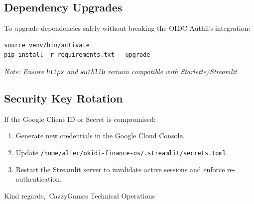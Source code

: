 \documentclass[12pt,a4paper]{article}
\begin{document}
\subsection{Dependency Upgrades}
To upgrade dependencies safely without breaking the OIDC Authlib integration:
\begin{verbatim}
source venv/bin/activate
pip install -r requirements.txt --upgrade
\end{verbatim}
\textit{Note: Ensure \texttt{httpx} and \texttt{authlib} remain compatible with Starlette/Streamlit.}

\subsection{Security Key Rotation}
If the Google Client ID or Secret is compromised:
\begin{enumerate}
    \item Generate new credentials in the Google Cloud Console.
    \item Update \texttt{/home/alier/okidi-finance-os/.streamlit/secrets.toml}.
    \item Restart the Streamlit server to invalidate active sessions and enforce re-authentication.
\end{enumerate}

\vspace{2cm}
Kind regards,\
CazzyGames Technical Operations
\end{document}
